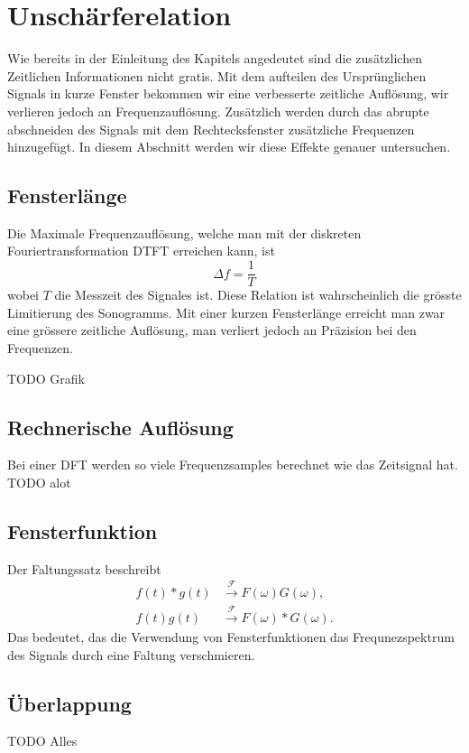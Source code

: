 %
%
%
%
\section{Unschärferelation
\label{sonogramm:section:teil1}}
Wie bereits in der Einleitung des Kapitels angedeutet sind die zusätzlichen
Zeitlichen Informationen nicht gratis. 
Mit dem aufteilen des Ursprünglichen Signals in kurze Fenster bekommen wir eine
verbesserte zeitliche Auflösung, wir verlieren jedoch an Frequenzauflösung.
Zusätzlich werden durch das abrupte abschneiden des Signals mit dem Rechtecksfenster
zusätzliche Frequenzen hinzugefügt. 
In diesem Abschnitt werden wir diese Effekte genauer untersuchen.
\subsection{Fensterlänge}
Die Maximale Frequenzauflösung, welche man mit der diskreten Fouriertransformation DTFT erreichen
kann, ist 
\begin{equation}
    \Delta f = \frac{1}{T}
\end{equation}
wobei $T$ die Messzeit des Signales ist.
Diese Relation ist wahrscheinlich die grösste Limitierung des Sonogramms.
Mit einer kurzen Fensterlänge erreicht man zwar eine grössere zeitliche Auflösung,
man verliert jedoch an Präzision bei den Frequenzen.

TODO Grafik

\subsection{Rechnerische Auflösung}
Bei einer DFT werden so viele Frequenzsamples berechnet wie das
Zeitsignal hat. 
TODO alot

\subsection{Fensterfunktion}
Der Faltungssatz beschreibt 
\begin{align}
    f(t) * g(t)& \xrightarrow{\mathscr{F}} F(\omega)G(\omega),\\
    f(t) g(t)&\xrightarrow{\mathscr{F}}F(\omega) * G(\omega).
\end{align}
Das bedeutet, das die Verwendung von Fensterfunktionen das Frequnezspektrum
des Signals durch eine Faltung verschmieren.
\subsection{Überlappung}
TODO Alles


